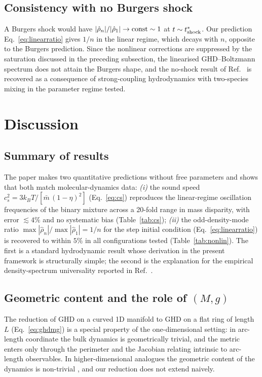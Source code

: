 \documentclass[aps,pre,twocolumn,superscriptaddress,longbibliography,floatfix]{revtex4-2}
\begin{document}
\subsection{Consistency with no Burgers shock}

A Burgers shock would have $|\hat\rho_n|/|\hat\rho_1|\to{\rm
const}\sim 1$ at $t\sim t^*_{\rm shock}$. Our prediction
Eq.~\eqref{eq:linearratio} gives $1/n$ in the linear regime,
which decays with $n$, opposite to the Burgers prediction.
Since the nonlinear corrections are suppressed by the
saturation discussed in the preceding subsection,
the linearised GHD--Boltzmann spectrum does not attain the
Burgers shape, and the no-shock result of
Ref.~\cite{PaperIII} is recovered as a consequence of
strong-coupling hydrodynamics with two-species mixing in the
parameter regime tested.

\section{Discussion}\label{sec:discussion}

\subsection{Summary of results}

The paper makes two quantitative predictions without free
parameters and shows that both match molecular-dynamics data:
\emph{(i)} the sound speed
$c_s^2 = 3 k_B T/[\bar m\,(1-\eta)^2]$
(Eq.~\ref{eq:cs}) reproduces the linear-regime oscillation
frequencies of the binary mixture across a 20-fold range in
mass disparity, with error $\lesssim 4\%$ and no systematic
bias (Table~\ref{tab:cs}); \emph{(ii)} the odd-density-mode
ratio $\max|\hat\rho_n|/\max|\hat\rho_1| = 1/n$ for the step
initial condition (Eq.~\ref{eq:linearratio}) is recovered to
within $5\%$ in all configurations tested
(Table~\ref{tab:nonlin}). The first is a standard
hydrodynamic result whose derivation in the present framework
is structurally simple; the second is the explanation for the
empirical density-spectrum universality reported in
Ref.~\cite{PaperIII}.

\subsection{Geometric content and the role of $(M,g)$}

The reduction of GHD on a curved 1D manifold to GHD on a flat
ring of length $L$ (Eq.~\ref{eq:ghdmg}) is a special property of
the one-dimensional setting: in arc-length coordinate the bulk
dynamics is geometrically trivial, and the metric enters only
through the perimeter and the Jacobian relating intrinsic to
arc-length observables. In higher-dimensional analogues the
geometric content of the dynamics is non-trivial \cite{
DoyonSpohnYoshimura2017}, and our reduction does not extend
naively.
\end{document}
